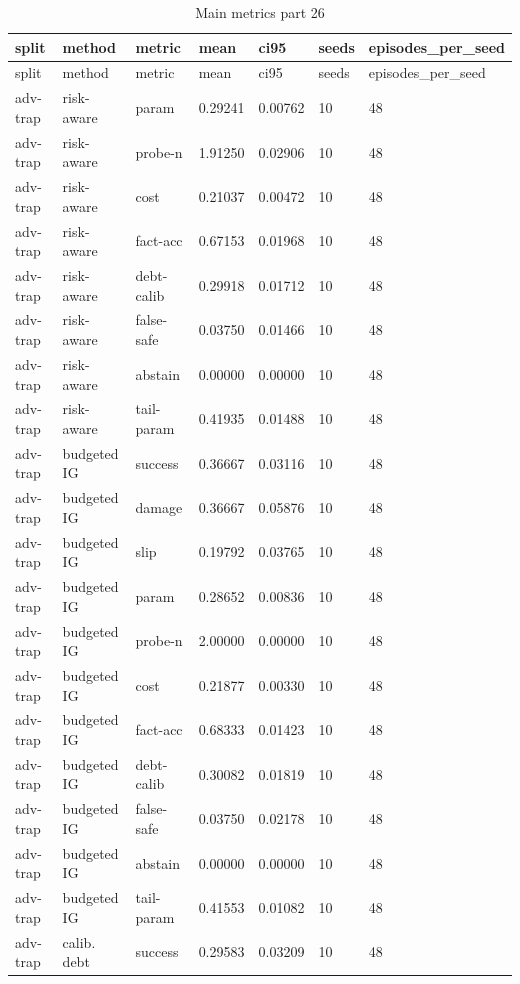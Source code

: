 \documentclass{article}
\begin{document}
\begin{center}
\tiny
\renewcommand{\arraystretch}{0.92}
\setlength{\tabcolsep}{3pt}
\begin{longtable}{lllllll}
\caption{Main metrics part 26}\label{tab:main-metrics-26}\\
\toprule
split & method & metric & mean & ci95 & seeds & episodes\_per\_seed \\
\midrule
\endfirsthead
\toprule
split & method & metric & mean & ci95 & seeds & episodes\_per\_seed \\
\midrule
\endhead
adv-trap & risk-aware & param & 0.29241 & 0.00762 & 10 & 48 \\
adv-trap & risk-aware & probe-n & 1.91250 & 0.02906 & 10 & 48 \\
adv-trap & risk-aware & cost & 0.21037 & 0.00472 & 10 & 48 \\
adv-trap & risk-aware & fact-acc & 0.67153 & 0.01968 & 10 & 48 \\
adv-trap & risk-aware & debt-calib & 0.29918 & 0.01712 & 10 & 48 \\
adv-trap & risk-aware & false-safe & 0.03750 & 0.01466 & 10 & 48 \\
adv-trap & risk-aware & abstain & 0.00000 & 0.00000 & 10 & 48 \\
adv-trap & risk-aware & tail-param & 0.41935 & 0.01488 & 10 & 48 \\
adv-trap & budgeted IG & success & 0.36667 & 0.03116 & 10 & 48 \\
adv-trap & budgeted IG & damage & 0.36667 & 0.05876 & 10 & 48 \\
adv-trap & budgeted IG & slip & 0.19792 & 0.03765 & 10 & 48 \\
adv-trap & budgeted IG & param & 0.28652 & 0.00836 & 10 & 48 \\
adv-trap & budgeted IG & probe-n & 2.00000 & 0.00000 & 10 & 48 \\
adv-trap & budgeted IG & cost & 0.21877 & 0.00330 & 10 & 48 \\
adv-trap & budgeted IG & fact-acc & 0.68333 & 0.01423 & 10 & 48 \\
adv-trap & budgeted IG & debt-calib & 0.30082 & 0.01819 & 10 & 48 \\
adv-trap & budgeted IG & false-safe & 0.03750 & 0.02178 & 10 & 48 \\
adv-trap & budgeted IG & abstain & 0.00000 & 0.00000 & 10 & 48 \\
adv-trap & budgeted IG & tail-param & 0.41553 & 0.01082 & 10 & 48 \\
adv-trap & calib. debt & success & 0.29583 & 0.03209 & 10 & 48 \\

\end{longtable}
\end{center}
\end{document}
